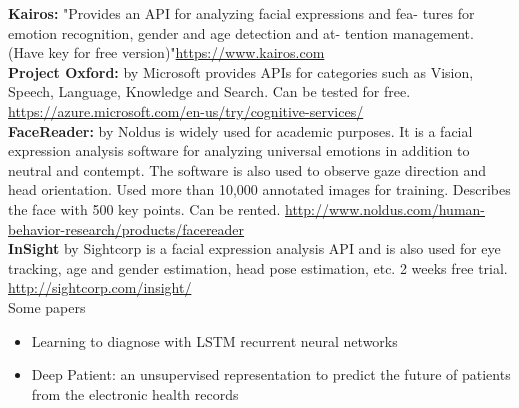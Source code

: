 \textbf{Kairos:} "Provides an API for analyzing facial expressions and fea- tures for emotion recognition, gender and age detection and at- tention management. (Have key for free version)"\url{https://www.kairos.com}\\

\textbf{Project Oxford:} by Microsoft provides APIs for categories such as Vision, Speech, Language, Knowledge and Search. Can be tested for free.
\url{https://azure.microsoft.com/en-us/try/cognitive-services/}\\

\textbf{FaceReader:} by Noldus is widely used for academic purposes. It is a facial expression analysis software for analyzing universal emotions in addition to neutral and contempt. The software is also used to observe gaze direction and head orientation. Used more than 10,000 annotated images for training. Describes the face with 500 key points. Can be rented. 
\url{http://www.noldus.com/human-behavior-research/products/facereader}\\

\textbf{InSight} by Sightcorp is a facial expression analysis API and is also used for eye tracking, age and gender estimation, head pose estimation, etc. 2 weeks free trial.
\url{http://sightcorp.com/insight/}\\

Some papers

\begin{itemize}
    \item Learning to diagnose with LSTM recurrent neural networks
    \item Deep Patient: an unsupervised representation to predict the future of patients from the electronic health records
\end{itemize}





